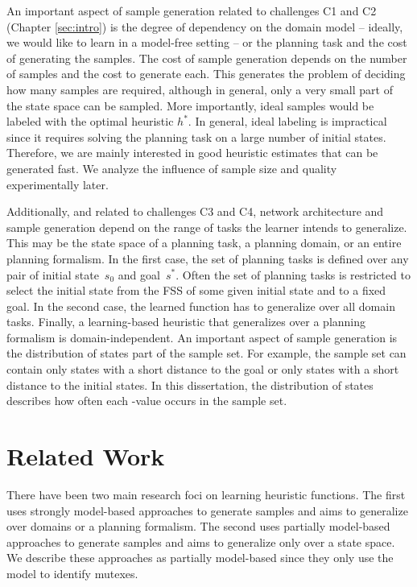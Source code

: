 An important aspect of sample generation related to challenges C1 and C2 (Chapter \ref{sec:intro}) is the degree of dependency on the domain model -- ideally, we would like to learn in a model-free setting -- or the planning task and the cost of generating the samples. The cost of sample generation depends on the number of samples and the cost to generate each. This generates the problem of deciding how many samples are required, although in general, only a very small part of the state space can be sampled. More importantly, ideal samples would be labeled with the optimal heuristic $h^*$. In general, ideal labeling is impractical since it requires solving the planning task on a large number of initial states. Therefore, we are mainly interested in good heuristic estimates that can be generated fast. We analyze the influence of sample size and quality experimentally later.

Additionally, and related to challenges C3 and C4, network architecture and sample generation depend on the range of tasks the learner intends to generalize. This may be the state space of a planning task, a planning domain, or an entire planning formalism. In the first case, the set of planning tasks is defined over any pair of initial state~$s_0$ and goal~$s^*$. Often the set of planning tasks is restricted to select the initial state from the FSS of some given initial state and to a fixed goal. In the second case, the learned function has to generalize over all domain tasks. Finally, a learning-based heuristic that generalizes over a planning formalism is domain-independent. An important aspect of sample generation is the distribution of states part of the sample set. For example, the sample set can contain only states with a short distance to the goal or only states with a short distance to the initial states. In this dissertation, the distribution of states describes how often each \hstar-value occurs in the sample set.

\section{Related Work}
\label{sec:background_relatedwork}

There have been two main research foci on learning heuristic functions. The first uses strongly model-based approaches to generate samples and aims to generalize over domains or a planning formalism. The second uses partially model-based approaches to generate samples and aims to generalize only over a state space. We describe these approaches as partially model-based since they only use the model to identify mutexes.

